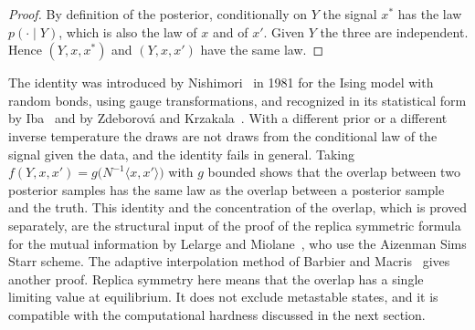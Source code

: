 \begin{proof}
By definition of the posterior, conditionally on $Y$ the signal $x^*$ has the law $p(\cdot\mid Y)$, which is also the law of $x$ and of $x'$. Given $Y$ the three are independent. Hence $(Y,x,x^*)$ and $(Y,x,x')$ have the same law.
\end{proof}

The identity was introduced by Nishimori~\cite{nishimori1981} in 1981 for the Ising model with random bonds, using gauge transformations, and recognized in its statistical form by Iba~\cite{iba1999} and by Zdeborov\'a and Krzakala~\cite{zdeborova2016}. With a different prior or a different inverse temperature the draws are not draws from the conditional law of the signal given the data, and the identity fails in general. Taking $f(Y,x,x') = g\big(N^{-1}\langle x,x'\rangle\big)$ with $g$ bounded shows that the overlap between two posterior samples has the same law as the overlap between a posterior sample and the truth. This identity and the concentration of the overlap, which is proved separately, are the structural input of the proof of the replica symmetric formula for the mutual information by Lelarge and Miolane~\cite{lelarge2019}, who use the Aizenman Sims Starr scheme. The adaptive interpolation method of Barbier and Macris~\cite{barbier2019} gives another proof. Replica symmetry here means that the overlap has a single limiting value at equilibrium. It does not exclude metastable states, and it is compatible with the computational hardness discussed in the next section.

